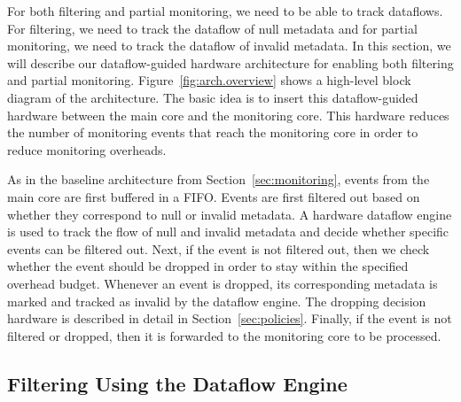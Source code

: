 For both filtering and partial monitoring, we need to be able to track
dataflows. For filtering, we need to track the dataflow of null metadata and
for partial monitoring, we need to track the dataflow of invalid metadata.
In this section, we will describe our dataflow-guided hardware architecture for
enabling both filtering and partial monitoring.
Figure~\ref{fig:arch.overview} shows a high-level block diagram of the
architecture. The basic idea is to insert this dataflow-guided hardware between the main core and
the monitoring core. This hardware reduces the number of monitoring events that reach
the monitoring core in order to reduce monitoring overheads.

As in the baseline architecture from Section~\ref{sec:monitoring}, events from
the main core are first buffered in a FIFO. 
Events are first filtered out based on whether they correspond to null or
invalid metadata. A hardware dataflow engine is used to track the flow of null
and invalid metadata and decide whether
specific events can be filtered out.
Next, if the event is not filtered out, then we
check whether the event should be dropped in order to stay within the specified
overhead budget. Whenever an event is dropped, its corresponding metadata is
marked and tracked as invalid by the dataflow engine. The
dropping decision hardware is described in detail in Section~\ref{sec:policies}.
Finally, if the event is not filtered or dropped, then it is forwarded to the
monitoring core to be processed.

\subsection{Filtering Using the Dataflow Engine}
\label{sec:arch.dataflow}

